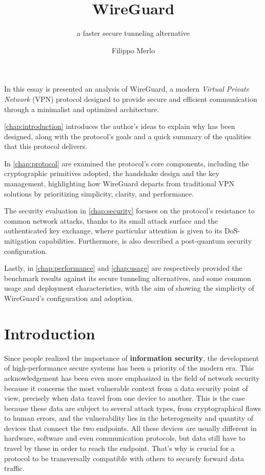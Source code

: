 \documentclass[light]{academica}
\title{WireGuard}
\subtitle{a faster secure tunneling alternative}
\author{Filippo Merlo}
\begin{document}
\maketitle

\frontmatter

\tableofcontents

\abstract

In this essay is presented an analysis of WireGuard, a modern \textit{Virtual Private Network} (VPN) protocol designed to provide secure and efficient communication through a minimalist and optimized architecture.

\autoref{chap:introduction} introduces the author's ideas to explain why has been designed, along with the protocol's goals and a quick summary of the qualities that this protocol delivers.

In \autoref{chap:protocol} are examined the protocol’s core components, including the cryptographic primitives adopted, the handshake design and the key management, highlighting how WireGuard departs from traditional VPN solutions by prioritizing simplicity, clarity, and performance.

The security evaluation in \autoref{chap:security} focuses on the protocol’s resistance to common network attacks, thanks to its small attack surface and the authenticated key exchange, where particular attention is given to its DoS-mitigation capabilities.
Furthermore, is also described a post-quantum security configuration.

Lastly, in \autoref{chap:performance} and \ref{chap:usage} are respectively provided the benchmark results against its secure tunneling alternatives, and some common usage and deployment characteristics, with the aim of showing the simplicity of WireGuard's configuration and adoption.

\mainmatter

\chapter{Introduction}\label{chap:introduction}

Since people realized the importance of \textbf{information security}, the development of high-performance secure systems has been a priority of the modern era.
This acknowledgement has been even more emphasized in the field of network security because it concerns the most vulnerable context from a data security point of view, precisely when data travel from one device to another.
This is the case because these data are subject to several attack types, from cryptographical flaws to human errors, and the vulnerability lies in the heterogeneity and quantity of devices that connect the two endpoints.
All these devices are usually different in hardware, software and even communication protocols, but data still have to travel by these in order to reach the endpoint.
That's why is crucial for a protocol to be transversally compatible with others to securely forward data traffic.
\end{document}
